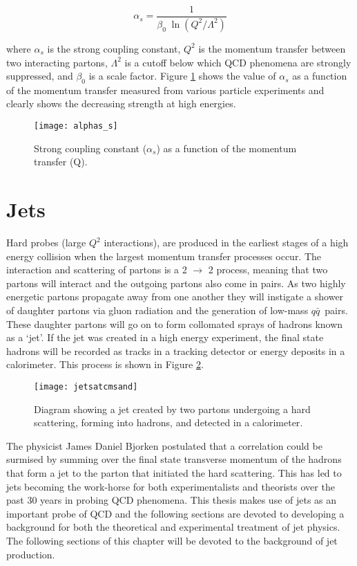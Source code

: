 \begin{equation}
\alpha_{s} = \frac{1}{\beta_{0} \; \ln(Q^{2}/\Lambda^{2} )}
\label{eq:alpha_s}
\end{equation}

\noindent
where $\alpha_{s}$ is the strong coupling constant, $Q^{2}$ is the momentum transfer between two interacting partons, $\Lambda^{2}$ is a cutoff below which QCD phenomena are strongly suppressed, and $\beta_{0}$ is a scale factor.  Figure \ref{fig:as} shows the value of $\alpha_{s}$ as a function of the momentum transfer measured from various particle experiments and clearly shows the decreasing strength at high energies.

\begin{figure}[h]
\texttt{[image: alphas\_s]}
\centering
\caption{Strong coupling constant ($\alpha_{s}$) as a function of the momentum transfer (Q)\cite{CMS:2014mna}.}
\label{fig:as}
\end{figure}

\section{Jets}

Hard probes (large $Q^{2}$ interactions), are produced in the earliest stages of a high energy collision when the largest momentum transfer processes occur.  The interaction and scattering of partons is a 2 $\rightarrow$ 2 process, meaning that two partons will interact and the outgoing partons also come in pairs.  As two highly energetic partons propagate away from one another they will instigate a shower of daughter partons via gluon radiation and the generation of low-mass $q \bar{q}$\, pairs.  These daughter partons will go on to form collomated sprays of hadrons known as a `jet'.  If the jet was created in a high energy experiment, the final state hadrons will be recorded as tracks in a tracking detector or energy deposits in a calorimeter.  This process is shown in Figure \ref{fig:MakeAJet}.



\begin{figure}[h]
\texttt{[image: jetsatcmsand]}
\centering
\caption{Diagram showing a jet created by two partons undergoing a hard scattering, forming into hadrons, and detected in a calorimeter\cite{JetPic}.}
\label{fig:MakeAJet}
\end{figure}

The physicist James Daniel Bjorken postulated that a correlation could be surmised by summing over the final state transverse momentum of the hadrons that form a jet to the parton that initiated the hard scattering\cite{PhysRev.179.1547}\cite{Bjorken:1973kd}.  This has led to jets becoming the work-horse for both experimentalists and theorists over the past 30 years in probing QCD phenomena.  This thesis makes use of jets as an important probe of QCD and the following sections are devoted to developing a background for both the theoretical and experimental treatment of jet physics.  The following sections of this chapter will be devoted to the background of jet production.

